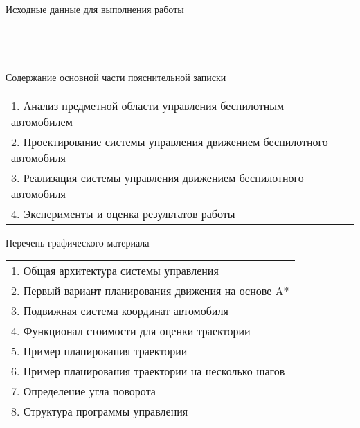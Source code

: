 
\noindent
Исходные данные для выполнения работы \\
\underline{\hspace{\linewidth}} \\
\underline{\hspace{\linewidth}} \\
\underline{\hspace{\linewidth}} \\
\underline{\hspace{\linewidth}} \\

\noindent
Содержание основной части пояснительной записки \\
\renewcommand{\arraystretch}{1}
\begin{tabularx}{\linewidth}{X}
    1. Анализ предметной области управления беспилотным автомобилем \\
    2. Проектирование системы управления движением беспилотного автомобиля \\
    3. Реализация системы управления движением беспилотного автомобиля \\
    4. Эксперименты и оценка результатов работы \\
\end{tabularx}

\newpage

\thispagestyle{empty}

\begin{center}
    Перечень графического материала
\end{center}

\noindent
\begin{tabularx}{\linewidth}{X}
    1. Общая архитектура системы управления \\
    2. Первый вариант планирования движения на основе A* \\
    3. Подвижная система координат автомобиля \\
    4. Функционал стоимости для оценки траектории \\
    5. Пример планирования траектории \\
    6. Пример планирования траектории на несколько шагов \\
    7. Определение угла поворота \\
    8. Структура программы управления \\
\end{tabularx}

